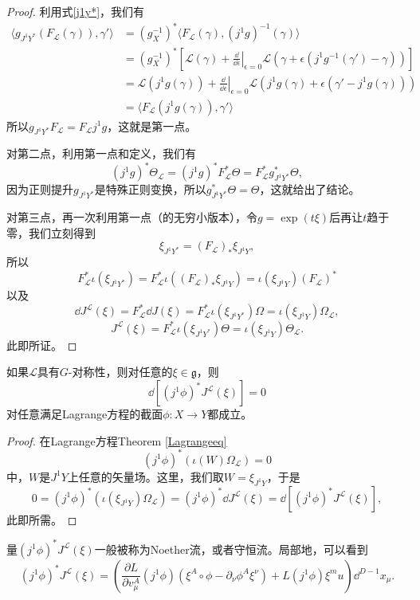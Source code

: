 \begin{proof}
利用式\eqref{j1y*}，我们有
\begin{align*}
	\langle g_{J^1Y^*}(F_{\mathcal L}(\gamma)),\gamma'\rangle&=(g_{X}^{-1})^*\langle F_{\mathcal L}(\gamma),(j^1g)^{-1}(\gamma)\rangle\\
&=(g_{X}^{-1})^*\left[
\mathcal L(\gamma)+\left.\frac{\dd}{\dd \epsilon}\right|_{\epsilon=0}\mathcal L(\gamma+\epsilon(j^1g^{-1}(\gamma')-\gamma))
\right]\\
&=
\mathcal L(j^1g(\gamma))+\left.\frac{\dd}{\dd \epsilon}\right|_{\epsilon=0}\mathcal L(j^1g(\gamma)+\epsilon(\gamma'-j^1g(\gamma)))\\
&=\langle F_{\mathcal L}(j^1g(\gamma)),\gamma'\rangle
\end{align*}
所以$g_{J^1Y^*}F_{\mathcal L}=F_{\mathcal L}j^1g$，这就是第一点。

对第二点，利用第一点和定义，我们有
\[
	(j^1g)^*\Theta_{\mathcal L}=(j^1g)^*F_{\mathcal L}^*\Theta=F_{\mathcal L}^*g_{J^1Y^*}^*\Theta,
\]
因为正则提升$g_{J^1Y^*}$是特殊正则变换，所以$g_{J^1Y^*}^*\Theta=\Theta$，这就给出了结论。

对第三点，再一次利用第一点（的无穷小版本），令$g=\exp(t\xi)$后再让$t$趋于零，我们立刻得到
\[
	\xi_{J^1Y^*}=(F_{\mathcal L})_{*}\xi_{J^1Y},
\]
所以
\[
	F_{\mathcal L}^*\iota(\xi_{J^1Y^*})=F_{\mathcal L}^*\iota((F_{\mathcal L})_{*}\xi_{J^1Y})=\iota(\xi_{J^1Y})(F_{\mathcal L})^{*}
\]
以及
\[
	 \dd J^\mathcal{L}(\xi)=F_{\mathcal L}^*\dd J(\xi)=F_{\mathcal L}^*\iota(\xi_{J^1Y^*})\Omega=
	 \iota(\xi_{J^1Y})\Omega_{\mathcal L},
\]
\[
	 J^\mathcal{L}(\xi)=F_{\mathcal L}^*\iota(\xi_{J^1Y^*})\Theta=\iota(\xi_{J^1Y})\Theta_{\mathcal L}.
\]
此即所证。
\end{proof}

\begin{thm}[Noether定理]
    如果$\mathcal L$具有$G$-对称性，则对任意的$\xi\in \mathfrak g$，则
    \[
        \dd \left[ (j^1\phi)^*J^{\mathcal L}(\xi)\right]=0
    \]
    对任意满足Lagrange方程的截面$\phi:X\to Y$都成立。
\end{thm}

\begin{proof}
在Lagrange方程Theorem \ref{Lagrangeeq}
\[
	(j^1\phi)^*(\iota(W)\Omega_{\mathcal L})=0
\]
中，$W$是$J^1Y$上任意的矢量场。这里，我们取$W=\xi_{J^1Y}$，于是
\[
	0=(j^1\phi)^*(\iota(\xi_{J^1Y})\Omega_{\mathcal L})=(j^1\phi)^*\dd J^\mathcal{L}(\xi)= \dd \left[ (j^1\phi)^*J^{\mathcal L}(\xi)\right],
\]
此即所需。
\end{proof}

量$(j^1\phi)^*J^{\mathcal L}(\xi)$一般被称为Noether流，或者守恒流。局部地，可以看到
\[
	(j^1\phi)^*J^{\mathcal L}(\xi)=\left(
\frac{\partial L}{\partial v^A_\mu}(j^1\phi)(\xi^A\circ \phi-\partial_\nu \phi^A\xi^\nu)
+L(j^1\phi)\xi^mu
	\right)\dd^{D-1}x_\mu.
\]